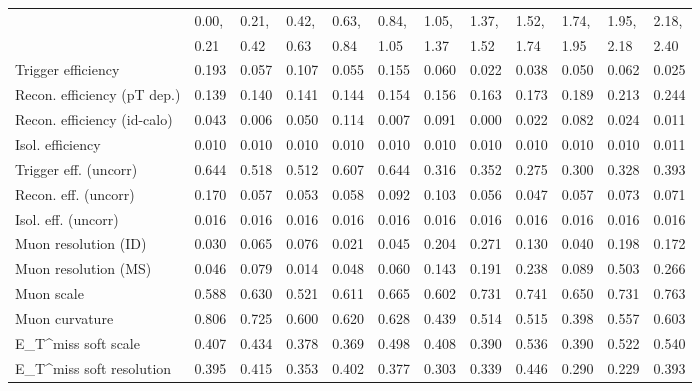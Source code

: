 \begin{tabular}{l|p{0.6cm}p{0.6cm}p{0.6cm}p{0.6cm}p{0.6cm}p{0.6cm}p{0.6cm}p{0.6cm}p{0.6cm}p{0.6cm}p{0.6cm}}
\hline
   & 0.00, & 0.21, & 0.42, & 0.63, & 0.84, & 1.05, & 1.37, & 1.52, & 1.74, & 1.95, & 2.18,  \\ 
   & 0.21 & 0.42 & 0.63 & 0.84 & 1.05 & 1.37 & 1.52 & 1.74 & 1.95 & 2.18 & 2.40  \\ 
\hline
Trigger efficiency                       & 0.193 & 0.057 & 0.107 & 0.055 & 0.155 & 0.060 & 0.022 & 0.038 & 0.050 & 0.062 & 0.025 \\
Recon. efficiency (pT dep.)              & 0.139 & 0.140 & 0.141 & 0.144 & 0.154 & 0.156 & 0.163 & 0.173 & 0.189 & 0.213 & 0.244 \\
Recon. efficiency (id-calo)              & 0.043 & 0.006 & 0.050 & 0.114 & 0.007 & 0.091 & 0.000 & 0.022 & 0.082 & 0.024 & 0.011 \\
Isol. efficiency                         & 0.010 & 0.010 & 0.010 & 0.010 & 0.010 & 0.010 & 0.010 & 0.010 & 0.010 & 0.010 & 0.011 \\
Trigger eff. (uncorr)                    & 0.644 & 0.518 & 0.512 & 0.607 & 0.644 & 0.316 & 0.352 & 0.275 & 0.300 & 0.328 & 0.393 \\
Recon. eff. (uncorr)                     & 0.170 & 0.057 & 0.053 & 0.058 & 0.092 & 0.103 & 0.056 & 0.047 & 0.057 & 0.073 & 0.071 \\
Isol. eff. (uncorr)                      & 0.016 & 0.016 & 0.016 & 0.016 & 0.016 & 0.016 & 0.016 & 0.016 & 0.016 & 0.016 & 0.016 \\
Muon resolution (ID)                     & 0.030 & 0.065 & 0.076 & 0.021 & 0.045 & 0.204 & 0.271 & 0.130 & 0.040 & 0.198 & 0.172 \\
Muon resolution (MS)                     & 0.046 & 0.079 & 0.014 & 0.048 & 0.060 & 0.143 & 0.191 & 0.238 & 0.089 & 0.503 & 0.266 \\
Muon scale                               & 0.588 & 0.630 & 0.521 & 0.611 & 0.665 & 0.602 & 0.731 & 0.741 & 0.650 & 0.731 & 0.763 \\
Muon curvature                           & 0.806 & 0.725 & 0.600 & 0.620 & 0.628 & 0.439 & 0.514 & 0.515 & 0.398 & 0.557 & 0.603 \\
E_{T}^{miss} soft scale                  & 0.407 & 0.434 & 0.378 & 0.369 & 0.498 & 0.408 & 0.390 & 0.536 & 0.390 & 0.522 & 0.540 \\
E_{T}^{miss} soft resolution             & 0.395 & 0.415 & 0.353 & 0.402 & 0.377 & 0.303 & 0.339 & 0.446 & 0.290 & 0.229 & 0.393 \\

\end{tabular}
